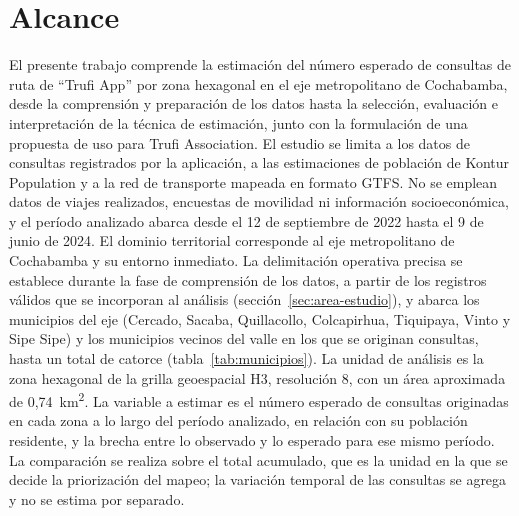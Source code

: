 \chapter{Alcance}
\label{cap:alcance}

El presente trabajo comprende la estimación del número esperado de consultas de ruta de
``Trufi App'' por zona hexagonal en el eje metropolitano de Cochabamba, desde la comprensión y
preparación de los datos hasta la selección, evaluación e interpretación de la técnica de
estimación, junto con la formulación de una propuesta de uso para Trufi Association. El
estudio se limita a los datos de consultas registrados por la aplicación, a las
estimaciones de población de Kontur Population y a la red de transporte mapeada en formato
GTFS. No se emplean datos de viajes realizados, encuestas de movilidad ni información
socioeconómica, y el período analizado abarca desde el 12 de septiembre de 2022 hasta el 9
de junio de 2024. El dominio territorial corresponde al eje metropolitano de Cochabamba y
su entorno inmediato. La delimitación operativa precisa se establece durante la fase de
comprensión de los datos, a partir de los registros válidos que se incorporan al análisis
(sección~\ref{sec:area-estudio}), y abarca los municipios del eje (Cercado, Sacaba,
Quillacollo, Colcapirhua, Tiquipaya, Vinto y Sipe Sipe) y los municipios vecinos del valle
en los que se originan consultas, hasta un total de catorce
(tabla~\ref{tab:municipios}). La unidad de análisis es la zona
hexagonal de la grilla geoespacial H3, resolución 8, con un área aproximada de
0,74~km\textsuperscript{2}. La variable a estimar es el número esperado de consultas
originadas en cada zona a lo largo del período analizado, en relación con su población
residente, y la brecha entre lo observado y lo esperado para ese mismo período. La
comparación se realiza sobre el total acumulado, que es la unidad en la que se decide la
priorización del mapeo; la variación temporal de las consultas se agrega y no se estima
por separado.

